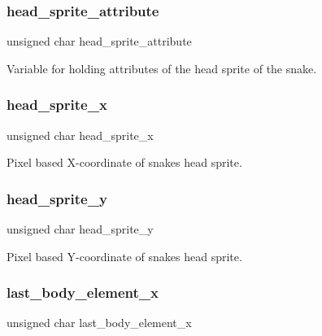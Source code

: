 \subsubsection{\texorpdfstring{head\+\_\+sprite\+\_\+attribute}{head\_sprite\_attribute}}
{\footnotesize\ttfamily unsigned char head\+\_\+sprite\+\_\+attribute}

Variable for holding attributes of the head sprite of the snake. \hypertarget{structsnake__struct_aded972bf189fa5a28e09cf0a71f59e6e}{}\label{structsnake__struct_aded972bf189fa5a28e09cf0a71f59e6e} 
\subsubsection{\texorpdfstring{head\+\_\+sprite\+\_\+x}{head\_sprite\_x}}
{\footnotesize\ttfamily unsigned char head\+\_\+sprite\+\_\+x}

Pixel based X-\/coordinate of snake\textquotesingle{}s head sprite. \hypertarget{structsnake__struct_af868f2fa25f812bc8d05bce98fdc964b}{}\label{structsnake__struct_af868f2fa25f812bc8d05bce98fdc964b} 
\subsubsection{\texorpdfstring{head\+\_\+sprite\+\_\+y}{head\_sprite\_y}}
{\footnotesize\ttfamily unsigned char head\+\_\+sprite\+\_\+y}

Pixel based Y-\/coordinate of snake\textquotesingle{}s head sprite. \hypertarget{structsnake__struct_a412e4ee1c9bc5e1128912fecb8f3f74a}{}\label{structsnake__struct_a412e4ee1c9bc5e1128912fecb8f3f74a} 
\subsubsection{\texorpdfstring{last\+\_\+body\+\_\+element\+\_\+x}{last\_body\_element\_x}}
{\footnotesize\ttfamily unsigned char last\+\_\+body\+\_\+element\+\_\+x}

